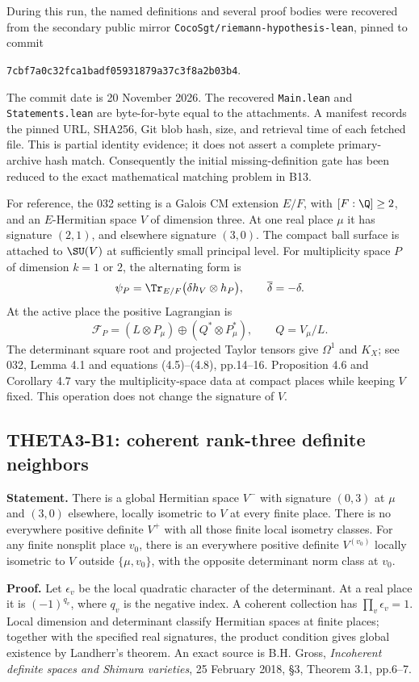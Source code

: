 During this run, the named definitions and several proof bodies were recovered from the secondary public mirror \texttt{CocoSgt/\allowbreak{}riemann-hypothesis-lean}, pinned to commit
\begin{center}\small\texttt{7cbf7a0c32fca1badf05931879a37c3f8a2b03b4}.\end{center}
The commit date is 20 November 2026. The recovered \texttt{Main.lean} and \texttt{Statements.lean} are byte-for-byte equal to the attachments. A manifest records the pinned URL, SHA256, Git blob hash, size, and retrieval time of each fetched file. This is partial identity evidence; it does not assert a complete primary-archive hash match. Consequently the initial missing-definition gate has been reduced to the exact mathematical matching problem in B13.

For reference, the 032 setting is a Galois CM extension $E/F$, with $[F:\Q]\geq2$, and an $E$-Hermitian space $V$ of dimension three. At one real place $\mu$ it has signature $(2,1)$, and elsewhere signature $(3,0)$. The compact ball surface is attached to $\SU(V)$ at sufficiently small principal level. For multiplicity space $P$ of dimension $k=1$ or $2$, the alternating form is
\[
 \psi_P=\Tr_{E/F}\bigl(\delta h_V\otimes h_P\bigr),
 \qquad \overline\delta=-\delta.
\]
At the active place the positive Lagrangian is
\[
 \mathcal F_P=(L\otimes P_\mu)\oplus(Q^*\otimes P_\mu^*),
 \qquad Q=V_\mu/L.
\]
The determinant square root and projected Taylor tensors give $\Omega^1$ and $K_X$; see 032, Lemma 4.1 and equations (4.5)--(4.8), pp.14--16. Proposition 4.6 and Corollary 4.7 vary the multiplicity-space data at compact places while keeping $V$ fixed. This operation does not change the signature of $V$.

\subsection{THETA3-B1: coherent rank-three definite neighbors}\label{B1}

\textbf{Statement.} There is a global Hermitian space $V^-$ with signature $(0,3)$ at $\mu$ and $(3,0)$ elsewhere, locally isometric to $V$ at every finite place. There is no everywhere positive definite $V^+$ with all those finite local isometry classes. For any finite nonsplit place $v_0$, there is an everywhere positive definite $V^{(v_0)}$ locally isometric to $V$ outside $\{\mu,v_0\}$, with the opposite determinant norm class at $v_0$.

\textbf{Proof.} Let $\epsilon_v$ be the local quadratic character of the determinant. At a real place it is $(-1)^{q_v}$, where $q_v$ is the negative index. A coherent collection has $\prod_v\epsilon_v=1$. Local dimension and determinant classify Hermitian spaces at finite places; together with the specified real signatures, the product condition gives global existence by Landherr's theorem. An exact source is B.H. Gross, \emph{Incoherent definite spaces and Shimura varieties}, 25 February 2018, \S3, Theorem 3.1, pp.6--7.

